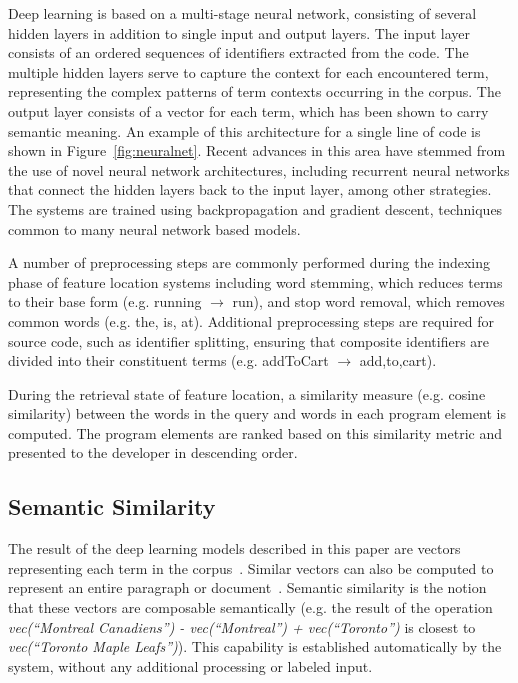 Deep learning is based on a multi-stage neural network, consisting of
several hidden layers in addition to single input and output layers.
The input layer consists of an ordered sequences of identifiers
extracted from the code. The multiple hidden layers serve to capture
the context for each encountered term, representing the complex
patterns of term contexts occurring in the corpus. The output layer
consists of a vector for each term, which has been shown to carry
semantic meaning. An example of this architecture for a single line of
code is shown in Figure~\ref{fig:neuralnet}. Recent advances in this
area have stemmed from the use of novel neural network architectures,
including recurrent neural networks that connect the hidden layers
back to the input layer, among other strategies. The systems are
trained using backpropagation and gradient descent, techniques common
to many neural network based models.

 
A number of preprocessing steps are commonly performed during the
indexing phase of feature location systems including word stemming,
which reduces terms to their base form (e.g. running $\rightarrow$
run), and stop word removal, which removes common words (e.g. the, is,
at). Additional preprocessing steps are required for source code, such
as identifier splitting, ensuring that composite identifiers are
divided into their constituent terms (e.g. addToCart $\rightarrow$
add,to,cart). 


During the retrieval state of feature location, a similarity measure
(e.g. cosine similarity) between the words in the query and words in
each program element is computed. The program elements are ranked
based on this similarity metric and presented to the developer in
descending order.


\subsection{Semantic Similarity}

The result of the deep learning models described in this paper are
vectors representing each term in the
corpus~\cite{mikolov_distributed_2013}. Similar vectors can also be
computed to represent an entire paragraph or
document~\cite{le_distributed_2014}.  Semantic similarity is the
notion that these vectors are composable semantically (e.g. the result
of the operation {\em vec(``Montreal Canadiens'') - vec(``Montreal'') +
vec(``Toronto'')} is closest to {\em vec(``Toronto Maple Leafs'')}). This
capability is established automatically by the system, without any
additional processing or labeled input.

